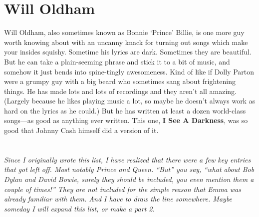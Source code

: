 \documentclass[letterpaper,single]{article}
\begin{document}
\section{Will Oldham}
Will Oldham, also sometimes known as Bonnie `Prince' Billie, is one
more guy worth knowing about with an uncanny knack for turning out
songs which make your insides squishy. Sometime his lyrics are dark.
Sometimes they are beautiful. But he can take a plain-seeming phrase and
stick it to a bit of music, and somehow it just bends into spine-tingly
awesomeness. Kind of like if Dolly Parton were a grumpy guy with a big
beard who sometimes sang about frightening things. He has made lots and
lots of recordings and they aren't all amazing. (Largely because he
likes playing music a lot, so maybe he doesn't always work as hard on
the lyrics as he could.) But he has written at least a dozen world-class
songs---as good as anything ever written. This one, \textbf{I See A
Darkness}, was so good that Johnny Cash himself did a version of it.\\
\\
\\
\textit{Since I originally wrote this list, I have realized that there
were a few key entries that got left off. Most notably Prince and Queen.
``But'' you say, ``what about Bob Dylan and David Bowie, surely they
should be included, you even mention them a couple of times!'' They are
not included for the simple reason that Emma was already familiar with
them. And I have to draw the line somewhere. Maybe someday I will expand
this list, or make a part 2.}
\end{document}
